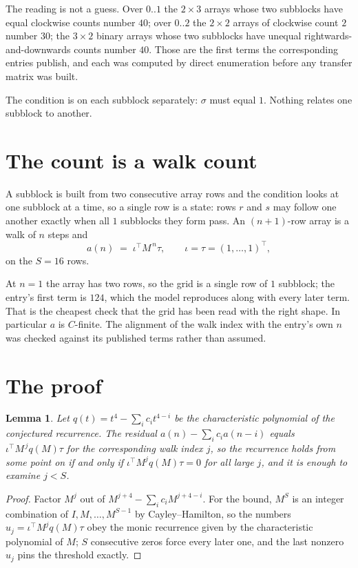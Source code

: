\documentclass[11pt,a4paper]{article}
\theoremstyle{plain}
\newtheorem{lemma}[theorem]{Lemma}
\theoremstyle{definition}
\begin{document}
The reading is not a guess. Over $0..1$ the $2\times3$ arrays whose two subblocks have equal
clockwise counts number $40$; over $0..2$ the $2\times2$ arrays of clockwise count $2$ number
$30$; the $3\times2$ binary arrays whose two subblocks have unequal rightwards-and-downwards
counts number $40$. Those are the first terms the corresponding entries publish, and each was
computed by direct enumeration before any transfer matrix was built.

The condition is on each subblock separately: $\sigma$ must equal $1$. Nothing
relates one subblock to another.

\section{The count is a walk count}

A subblock is built from two consecutive array rows and the condition looks
at one subblock at a time, so a single row is a state: rows $r$ and $s$ may follow one another
exactly when all $1$ subblocks they form pass. An $(n+1)$-row array is a walk of $n$ steps and
\[
a(n)\;=\;\iota^{\!\top}M^{\,n}\tau,\qquad\iota=\tau=(1,\dots,1)^{\!\top},
\]
on the $S=16$ rows.

At $n=1$ the array has two rows, so the grid is a single row of $1$
subblock; the entry's first term is $124$, which the model
reproduces along with every later term. That is the cheapest check that the grid has been read
with the right shape.
In particular $a$ is $C$-finite. The alignment of the walk index with the entry's own $n$ was
checked against its published terms rather than assumed.

\section{The proof}

\begin{lemma}\label{lem:crit}
Let $q(t)=t^{4}-\sum_i c_it^{4-i}$ be the characteristic polynomial of the
conjectured recurrence. The residual $a(n)-\sum_ic_ia(n-i)$ equals
$\iota^{\!\top}M^{\,j}q(M)\tau$ for the corresponding walk index $j$, so the recurrence
holds from some point on if and only if $\iota^{\!\top}M^{j}q(M)\tau=0$ for all large $j$,
and it is enough to examine $j<S$.
\end{lemma}

\begin{proof}
Factor $M^{j}$ out of $M^{j+4}-\sum_ic_iM^{j+4-i}$. For the bound, $M^{S}$
is an integer combination of $I,M,\dots,M^{S-1}$ by Cayley--Hamilton, so the numbers
$u_j=\iota^{\!\top}M^{j}q(M)\tau$ obey the monic recurrence given by the characteristic
polynomial of $M$; $S$ consecutive zeros force every later one, and the last nonzero $u_j$
pins the threshold exactly.
\end{proof}
\end{document}
